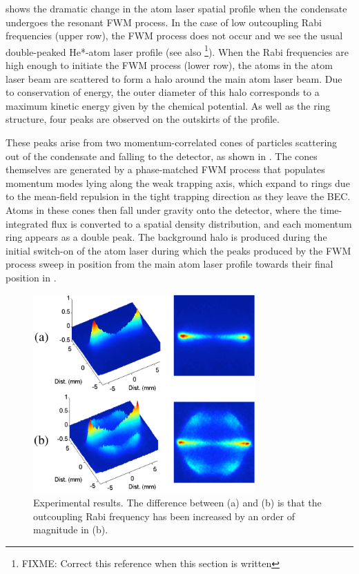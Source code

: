  shows the dramatic change in the atom laser spatial profile when the condensate undergoes the resonant FWM process. In the case of low outcoupling Rabi frequencies (upper row), the FWM process does not occur and we see the usual double-peaked He*-atom laser profile \citep{Dall:2007} (see also \footnote{FIXME: Correct this reference when this section is written}). When the Rabi frequencies are high enough to initiate the FWM process (lower row), the atoms in the atom laser beam are scattered to form a halo around the main atom laser beam. Due to conservation of energy, the outer diameter of this halo corresponds to a maximum kinetic energy given by the chemical potential. As well as the ring structure, four peaks are observed on the outskirts of the profile.

These peaks arise from two momentum-correlated cones of particles scattering out of the condensate and falling to the detector, as shown in . The cones themselves are generated by a phase-matched FWM process that populates momentum modes lying along the weak trapping axis, which expand to rings due to the mean-field repulsion in the tight trapping direction as they leave the BEC. Atoms in these cones then fall under gravity onto the detector, where the time-integrated flux is converted to a spatial density distribution, and each momentum ring appears as a double peak. The background halo is produced during the initial switch-on of the atom laser during which the peaks produced by the FWM process sweep in position from the main atom laser profile towards their final position in .

\begin{figure}[htbp]
    \centering
        \includegraphics[height=3in]{ExperimentalResults}
    \caption{Experimental results. The difference between (a) and (b) is that the outcoupling Rabi frequency has been increased by an order of magnitude in (b).}
    \label{Peaks:ExperimentalResults}
\end{figure}

